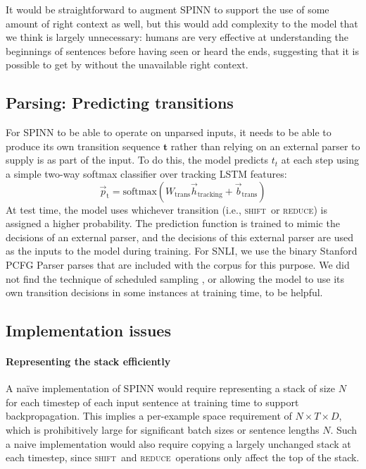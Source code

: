 \documentclass[11pt]{article}
\newcommand{\shift}{\textsc{shift}}
\newcommand{\reduce}{\textsc{reduce}}
\begin{document}
It would be straightforward to augment SPINN to support the use of some amount of right context as well, but this would add complexity to the model that we think is largely unnecessary: humans are very effective at understanding the beginnings of sentences before having seen or heard the ends, suggesting that it is possible to get by without the unavailable right context.

\subsection{Parsing: Predicting transitions}

For SPINN to be able to operate on unparsed inputs, it needs to be able to produce its own transition sequence $\mathbf t$ rather than relying on an external parser to supply is as part of the input. To do this, the model predicts $t_t$ at each step using a simple two-way softmax classifier over tracking LSTM features:
\begin{equation}
\vec{p}_{\text{t}} = \text{softmax}(W_{\text{trans}}\vec{h}_{\text{tracking}} + \vec{b}_{\text{trans}})
\end{equation}
At test time, the model uses whichever transition (i.e., \shift~or \reduce) is assigned a higher probability. The prediction function is trained to mimic the decisions of an external parser, and the decisions of this external parser are used as the inputs to the model during training. For SNLI, we use the binary Stanford PCFG Parser parses that are included with the corpus for this purpose. We did not find the technique of scheduled sampling \citep{bengio2015scheduled}, or allowing the model to use its own transition decisions in some instances at training time, to be helpful.

\subsection{Implementation issues}

\paragraph{Representing the stack efficiently}

A na\"ive implementation of SPINN would require representing a stack of size $N$ for each timestep of each input sentence at training time to support backpropagation. This implies a per-example space requirement of $N \times T \times D$, which is prohibitively large for significant batch sizes or sentence lengths $N$. Such a naive implementation would also require copying a largely unchanged stack at each timestep, since \shift~and \reduce~operations only affect the top of the stack.
\end{document}
